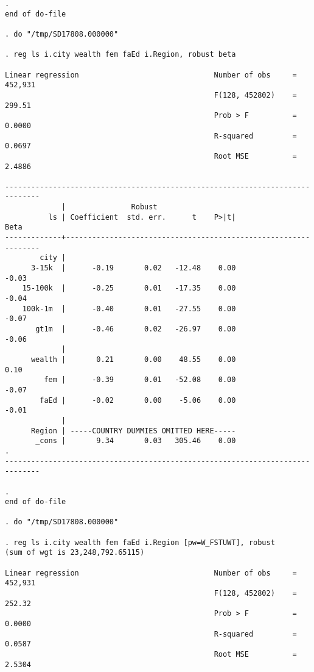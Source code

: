 \documentclass[11pt, letterpaper]{article}
\begin{document}
\begin{spacing}{1.9}
\begin{spacing}{.5}
\begin{scriptsize}
\begin{verbatim}
. 
end of do-file

. do "/tmp/SD17808.000000"

. reg ls i.city wealth fem faEd i.Region, robust beta 

Linear regression                               Number of obs     =    452,931
                                                F(128, 452802)    =     299.51
                                                Prob > F          =     0.0000
                                                R-squared         =     0.0697
                                                Root MSE          =     2.4886

------------------------------------------------------------------------------
             |               Robust
          ls | Coefficient  std. err.      t    P>|t|                     Beta
-------------+----------------------------------------------------------------
        city |
      3-15k  |      -0.19       0.02   -12.48    0.00                    -0.03
    15-100k  |      -0.25       0.01   -17.35    0.00                    -0.04
    100k-1m  |      -0.40       0.01   -27.55    0.00                    -0.07
       gt1m  |      -0.46       0.02   -26.97    0.00                    -0.06
             |
      wealth |       0.21       0.00    48.55    0.00                     0.10
         fem |      -0.39       0.01   -52.08    0.00                    -0.07
        faEd |      -0.02       0.00    -5.06    0.00                    -0.01
             |
      Region | -----COUNTRY DUMMIES OMITTED HERE-----
       _cons |       9.34       0.03   305.46    0.00                        .
------------------------------------------------------------------------------

. 
end of do-file

. do "/tmp/SD17808.000000"

. reg ls i.city wealth fem faEd i.Region [pw=W_FSTUWT], robust
(sum of wgt is 23,248,792.65115)

Linear regression                               Number of obs     =    452,931
                                                F(128, 452802)    =     252.32
                                                Prob > F          =     0.0000
                                                R-squared         =     0.0587
                                                Root MSE          =     2.5304


\end{verbatim}
\end{scriptsize}
\end{spacing}
\end{spacing}
\end{document}
